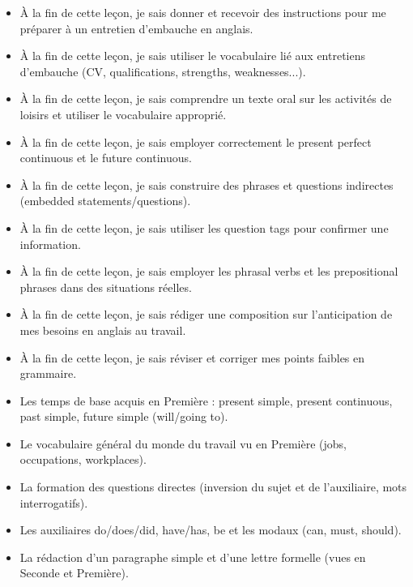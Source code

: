 \documentclass[11pt]{article}
\begin{document}
\begin{objectifs}
\begin{itemize}
\item À la fin de cette leçon, je sais donner et recevoir des instructions pour me préparer à un entretien d'embauche en anglais.
\item À la fin de cette leçon, je sais utiliser le vocabulaire lié aux entretiens d'embauche (CV, qualifications, strengths, weaknesses...).
\item À la fin de cette leçon, je sais comprendre un texte oral sur les activités de loisirs et utiliser le vocabulaire approprié.
\item À la fin de cette leçon, je sais employer correctement le present perfect continuous et le future continuous.
\item À la fin de cette leçon, je sais construire des phrases et questions indirectes (embedded statements/questions).
\item À la fin de cette leçon, je sais utiliser les question tags pour confirmer une information.
\item À la fin de cette leçon, je sais employer les phrasal verbs et les prepositional phrases dans des situations réelles.
\item À la fin de cette leçon, je sais rédiger une composition sur l'anticipation de mes besoins en anglais au travail.
\item À la fin de cette leçon, je sais réviser et corriger mes points faibles en grammaire.
\end{itemize}
\end{objectifs}

\begin{prerequis}
\begin{itemize}
\item Les temps de base acquis en Première : present simple, present continuous, past simple, future simple (will/going to).
\item Le vocabulaire général du monde du travail vu en Première (jobs, occupations, workplaces).
\item La formation des questions directes (inversion du sujet et de l'auxiliaire, mots interrogatifs).
\item Les auxiliaires do/does/did, have/has, be et les modaux (can, must, should).
\item La rédaction d'un paragraphe simple et d'une lettre formelle (vues en Seconde et Première).
\end{itemize}
\end{prerequis}
\end{document}
